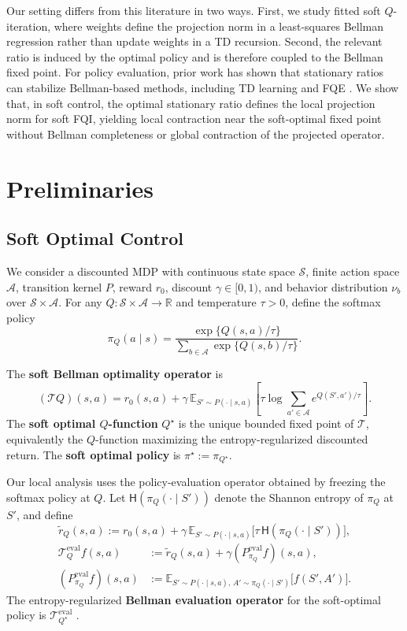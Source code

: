 \documentclass{article}
\theoremstyle{plain}
\theoremstyle{definition}
\theoremstyle{remark}
\newcommand{\E}{\mathbb{E}}
\begin{document}
Our setting differs from this literature in two ways. First, we study fitted
soft \(Q\)-iteration, where weights define the projection norm in a
least-squares Bellman regression rather than update weights in a TD recursion.
Second, the relevant ratio is induced by the optimal policy and is therefore
coupled to the Bellman fixed point. For policy evaluation, prior work has shown
that stationary ratios can stabilize Bellman-based methods, including TD
learning and FQE
\citep{van2006performance,patterson2022generalized,vdLaanKallus2025FQE}. We
show that, in soft control, the optimal stationary ratio defines the local
projection norm for soft FQI, yielding local contraction near the
soft-optimal fixed point without Bellman completeness or global contraction of
the projected operator.  

\section{Preliminaries}
\label{sec:preliminaries}

\subsection{Soft Optimal Control}
\label{subsec:soft-optimal-control}

We consider a discounted MDP with continuous state space \(\mathcal S\), finite action
space \(\mathcal A\), transition kernel \(P\), reward \(r_0\), discount
\(\gamma\in[0,1)\), and behavior distribution \(\nu_b\) over
\(\mathcal S\times\mathcal A\). For any \(Q:\mathcal S\times\mathcal A\to
\mathbb R\) and temperature \(\tau>0\), define the softmax policy
\[
\pi_Q(a\mid s)
=
\frac{\exp\{Q(s,a)/\tau\}}
     {\sum_{b\in\mathcal A}\exp\{Q(s,b)/\tau\}}.
\]

The \textbf{soft Bellman optimality operator} \citep{haarnoja2017reinforcement,haarnoja2018soft,uehara2023offline} is
\[
(\mathcal T Q)(s,a)
=
r_0(s,a)
+\gamma\,\E_{S'\sim P(\cdot\mid s,a)}
\left[
\tau \log \sum_{a'\in\mathcal A} e^{Q(S',a')/\tau}
\right].
\]
The \textbf{soft optimal \(Q\)-function} \(Q^\star\) is the unique bounded fixed
point of \(\mathcal T\), equivalently the \(Q\)-function maximizing the
entropy-regularized discounted return. The \textbf{soft optimal
policy} is \(\pi^\star:=\pi_{Q^\star}\).

Our local analysis uses the policy-evaluation operator obtained by freezing the
softmax policy at \(Q\). Let \(\mathsf H(\pi_Q(\cdot\mid S'))\) denote the
Shannon entropy of \(\pi_Q\) at \(S'\), and define
\[
\tilde r_Q(s,a)
:=
r_0(s,a)
+
\gamma\,\E_{S'\sim P(\cdot\mid s,a)}
\bigl[\tau\,\mathsf H(\pi_Q(\cdot\mid S'))\bigr],
\]
\[
\begin{aligned}
\mathcal T^{\mathrm{eval}}_{Q}f(s,a)
&:=
\tilde r_Q(s,a)
+
\gamma(P^{\mathrm{eval}}_{\pi_Q}f)(s,a),\\
(P^{\mathrm{eval}}_{\pi_Q}f)(s,a)
&:=
\E_{S'\sim P(\cdot\mid s,a),\,A'\sim\pi_Q(\cdot\mid S')}
\bigl[f(S',A')\bigr].
\end{aligned}
\]
The
entropy-regularized \textbf{Bellman evaluation operator} for the soft-optimal policy is \(\mathcal{T}^{\mathrm{eval}}_{Q^\star}\) .
\end{document}
